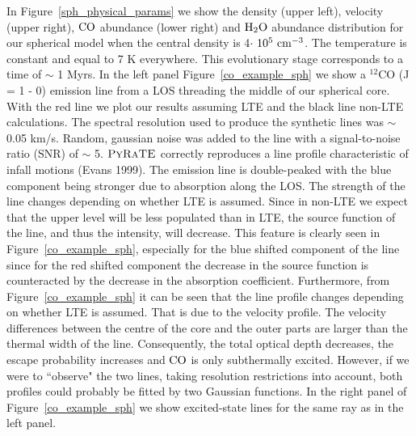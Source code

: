 \documentclass{mn2e}
\begin{document}
In Figure~\ref{sph_physical_params} we show the density (upper left), velocity (upper right), $\rm{CO}$ abundance (lower right) and $\rm{H_2O}$ abundance distribution for our spherical model when the central density is 4$\cdot~10^5~\rm{cm^{-3}}$. The temperature is constant and equal to 7 K everywhere. This evolutionary stage corresponds to a time of $\sim$ 1 Myrs. In the left panel Figure~\ref{co_example_sph} we show a $^{12}$CO (J = 1 - 0) emission line from a LOS threading the middle of our spherical core. With the red line we plot our results assuming LTE and the black line non-LTE calculations. The spectral resolution used to produce the synthetic lines was $\sim$ 0.05 km/s. Random, gaussian noise was added to the line with a signal-to-noise ratio (SNR) of $\sim$ 5. $\textsc{PyRaTE}$ correctly reproduces a line profile characteristic of infall motions (Evans 1999). The emission line is double-peaked with the blue component being stronger due to absorption along the LOS. The strength of the line changes depending on whether LTE is assumed. Since in non-LTE we expect that the upper level will be less populated than in LTE, the source function of the line, and thus the intensity, will decrease. This feature is clearly seen in Figure~\ref{co_example_sph}, especially for the blue shifted component of the line since for the red shifted component the decrease in the source function is counteracted by the decrease in the absorption coefficient. Furthermore, from Figure~\ref{co_example_sph} it can be seen that the line profile changes depending on whether LTE is assumed. That is due to the velocity profile. The velocity differences between the centre of the core and the outer parts are larger than the thermal width of the line. Consequently, the total optical depth decreases, the escape probability increases and $\rm{CO}$ is only subthermally excited. However, if we were to ``observe" the two lines, taking resolution restrictions into account, both profiles could probably be fitted by two Gaussian functions. In the right panel of Figure~\ref{co_example_sph} we show excited-state lines for the same ray as in the left panel.
\end{document}
